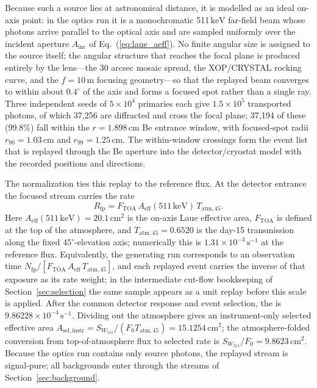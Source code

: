 \documentclass[11pt]{article}
\newcommand{\keV}{\ensuremath{\,\mathrm{keV}}}
\newcommand{\cps}{\ensuremath{\,\mathrm{s^{-1}}}}
\newcommand{\wii}{W_{511}}
\newcommand{\aeff}{A_{\mathrm{eff}}}
\newcommand{\fzero}{F_{0}}
\begin{document}
Because such a source lies at astronomical distance, it is modelled as an ideal
on-axis point: in the optics run it is a monochromatic 511\keV{} far-field beam
whose photons arrive parallel to the optical axis and are sampled uniformly over
the incident aperture $A_{\mathrm{inc}}$ of Eq.~(\ref{eq:laue_aeff}). No finite
angular size is assigned to the source itself; the angular structure that reaches
the focal plane is produced entirely by the lens---the 30 arcsec mosaic spread,
the XOP/CRYSTAL rocking curve, and the $f=10\,\mathrm{m}$ focusing geometry---so
that the replayed beam converges to within about $0.4^\circ$ of the axis and
forms a focused spot rather than a single ray. Three independent seeds of
$5\times10^{4}$ primaries each give $1.5\times10^{5}$ transported photons, of
which 37,256 are diffracted and cross the focal plane; 37,194 of these (99.8\%)
fall within the $r=1.898\,\mathrm{cm}$ Be entrance window, with focused-spot
radii $r_{90}=1.03\,\mathrm{cm}$ and $r_{99}=1.25\,\mathrm{cm}$. The
within-window crossings form the event list that is replayed through the Be
aperture into the detector/cryostat model with the recorded positions and
directions.

The normalization ties this replay to the reference flux. At the detector
entrance the focused stream carries the rate
\begin{equation}
  R_{\mathrm{fp}}=F_{\mathrm{TOA}}\,\aeff(511\keV)\,T_{\mathrm{atm},45} .
\end{equation}
Here
$\aeff(511\keV)=20.1\,\mathrm{cm^2}$ is the on-axis Laue effective area,
$F_{\mathrm{TOA}}$ is defined at the top of the atmosphere, and
$T_{\mathrm{atm},45}=0.6520$ is the day-15 transmission along the fixed
$45^\circ$-elevation axis; numerically this is $1.31\times10^{-3}\cps$ at the
reference flux.
Equivalently, the generating run corresponds to an observation time
$N_{\mathrm{fp}}/[F_{\mathrm{TOA}}\,\aeff\,T_{\mathrm{atm},45}]$, and each replayed event carries the inverse
of that exposure as its rate weight; in the intermediate cut-flow bookkeeping of
Section~\ref{sec:selection} the same sample appears as a unit replay before this
scale is applied. After the common detector response and event selection, the
 is $9.86228\times10^{-4}\cps$. Dividing out the atmosphere
gives an instrument-only selected effective area
$A_{\mathrm{sel,instr}}=S_{\wii}/(\fzero T_{\mathrm{atm},45})=15.1254\,\mathrm{cm^2}$;
the atmosphere-folded conversion from top-of-atmosphere flux to selected rate is
$S_{\wii}/\fzero=9.8623\,\mathrm{cm^2}$. Because the optics run
contains only source photons, the replayed stream is signal-pure; all
backgrounds enter through the streams of Section~\ref{sec:background}.
\end{document}
